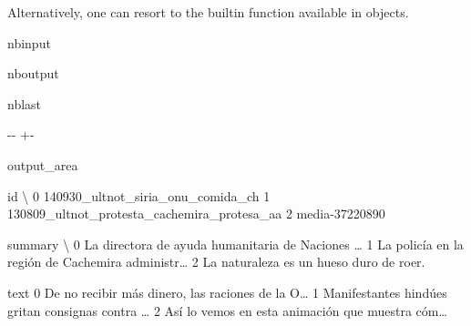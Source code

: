 \documentclass[letterpaper,10pt,english]{sphinxmanual}
\newlength\nbsphinxcodecellspacing
\begin{document}
\sphinxAtStartPar
Alternatively, one can resort to the built\sphinxhyphen{}in function  available in  objects.

\begin{sphinxuseclass}{nbinput}
{
\begin{sphinxVerbatim}[commandchars=\\\{\}]
\llap{\color{nbsphinxin}[13]:\,\hspace{\fboxrule}\hspace{\fboxsep}}
\end{sphinxVerbatim}
}

\end{sphinxuseclass}
\begin{sphinxuseclass}{nboutput}
\begin{sphinxuseclass}{nblast}
{

\kern-\sphinxverbatimsmallskipamount\kern-\baselineskip
\kern+\FrameHeightAdjust\kern-\fboxrule
\vspace{\nbsphinxcodecellspacing}

\begin{sphinxuseclass}{output_area}
\begin{sphinxuseclass}{}


\begin{sphinxVerbatim}[commandchars=\\\{\}]
\llap{\color{nbsphinxout}[13]:\,\hspace{\fboxrule}\hspace{\fboxsep}}                                            id  \textbackslash{}
0            140930\_ultnot\_siria\_onu\_comida\_ch
1  130809\_ultnot\_protesta\_cachemira\_protesa\_aa
2                               media-37220890

                                             summary  \textbackslash{}
0  La directora de ayuda humanitaria de Naciones {\ldots}
1  La policía en la región de Cachemira administr{\ldots}
2            La naturaleza es un hueso duro de roer.

                                                text
0  De no recibir más dinero, las raciones de la O{\ldots}
1  Manifestantes hindúes gritan consignas contra {\ldots}
2  Así lo vemos en esta animación que muestra cóm{\ldots}
\end{sphinxVerbatim}



\end{sphinxuseclass}
\end{sphinxuseclass}
}

\end{sphinxuseclass}
\end{sphinxuseclass}
\end{document}
